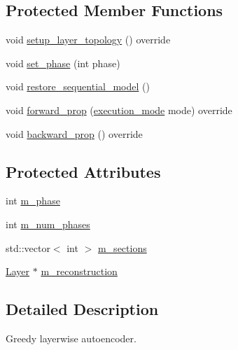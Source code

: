 \subsection*{Protected Member Functions}
\begin{DoxyCompactItemize}
\item 
void \hyperlink{classlbann_1_1greedy__layerwise__autoencoder_a115607e435ae4685531a81852ce01fe7}{setup\+\_\+layer\+\_\+topology} () override
\item 
void \hyperlink{classlbann_1_1greedy__layerwise__autoencoder_a5f237f1f6285475c5493a7d15dc32096}{set\+\_\+phase} (int phase)
\item 
void \hyperlink{classlbann_1_1greedy__layerwise__autoencoder_a82b8ced756904a2423a65cd0e329b4e2}{restore\+\_\+sequential\+\_\+model} ()
\item 
void \hyperlink{classlbann_1_1greedy__layerwise__autoencoder_af16aa7d2336a3f64e27970241cb2cd3e}{forward\+\_\+prop} (\hyperlink{base_8hpp_a2781a159088df64ed7d47cc91c4dc0a8}{execution\+\_\+mode} mode) override
\item 
void \hyperlink{classlbann_1_1greedy__layerwise__autoencoder_a6d39fda041fe570a668cb72594508062}{backward\+\_\+prop} () override
\end{DoxyCompactItemize}
\subsection*{Protected Attributes}
\begin{DoxyCompactItemize}
\item 
int \hyperlink{classlbann_1_1greedy__layerwise__autoencoder_a1baf1b5e7fdb5d006f443edbb0bb2973}{m\+\_\+phase}
\item 
int \hyperlink{classlbann_1_1greedy__layerwise__autoencoder_a792010a00136ee1e024b6e5d38c77386}{m\+\_\+num\+\_\+phases}
\item 
std\+::vector$<$ int $>$ \hyperlink{classlbann_1_1greedy__layerwise__autoencoder_aacb3dbf01c38f46a32927722420c5d41}{m\+\_\+sections}
\item 
\hyperlink{classlbann_1_1Layer}{Layer} $\ast$ \hyperlink{classlbann_1_1greedy__layerwise__autoencoder_a8238d2e3e723543c8b6f7f5c61a9ca06}{m\+\_\+reconstruction}
\end{DoxyCompactItemize}


\subsection{Detailed Description}
Greedy layerwise autoencoder. 

